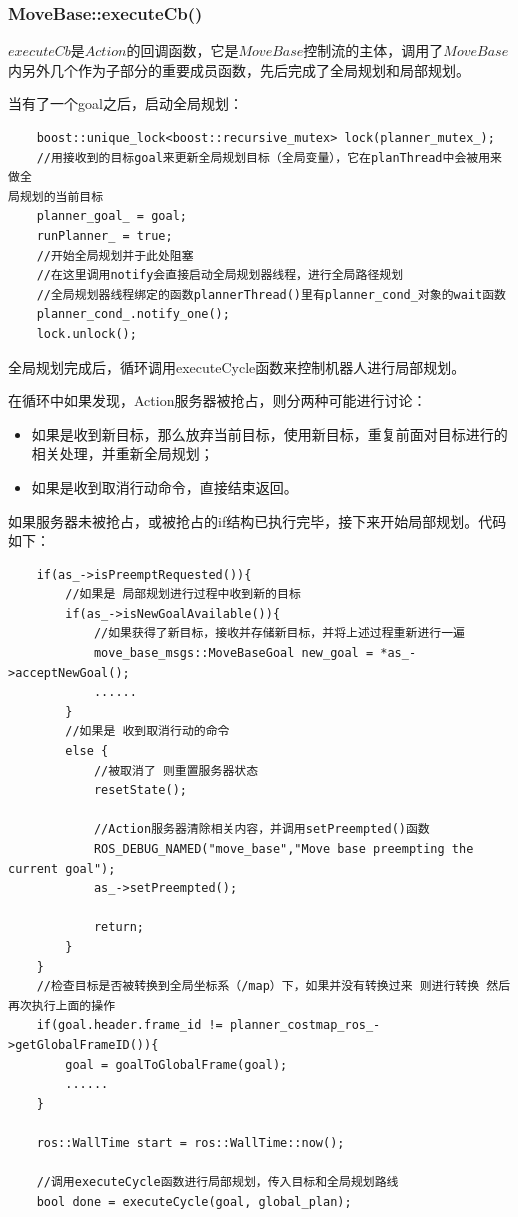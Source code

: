 \documentclass[9pt, oneside]{book}
\begin{document}
\subsubsection{MoveBase::executeCb()}

$executeCb$是$Action$的回调函数，它是$MoveBase$控制流的主体，调用了$MoveBase$内另外几个作为子部分的重要成员函数，先后完成了全局规划和局部规划。

当有了一个goal之后，启动全局规划：

\begin{verbatim}
    boost::unique_lock<boost::recursive_mutex> lock(planner_mutex_);
    //用接收到的目标goal来更新全局规划目标（全局变量），它在planThread中会被用来做全
局规划的当前目标
    planner_goal_ = goal;
    runPlanner_ = true;
    //开始全局规划并于此处阻塞
    //在这里调用notify会直接启动全局规划器线程，进行全局路径规划
    //全局规划器线程绑定的函数plannerThread()里有planner_cond_对象的wait函数
    planner_cond_.notify_one();
    lock.unlock();
\end{verbatim}

全局规划完成后，循环调用executeCycle函数来控制机器人进行局部规划。

在循环中如果发现，Action服务器被抢占，则分两种可能进行讨论：

\begin{itemize}
    \item 如果是收到新目标，那么放弃当前目标，使用新目标，重复前面对目标进行的相关处理，并重新全局规划；
    \item 如果是收到取消行动命令，直接结束返回。
\end{itemize}

如果服务器未被抢占，或被抢占的if结构已执行完毕，接下来开始局部规划。代码如下：

\footnotesize
\begin{verbatim}
    if(as_->isPreemptRequested()){
        //如果是 局部规划进行过程中收到新的目标
        if(as_->isNewGoalAvailable()){
            //如果获得了新目标，接收并存储新目标，并将上述过程重新进行一遍
            move_base_msgs::MoveBaseGoal new_goal = *as_->acceptNewGoal();
            ......
        }
        //如果是 收到取消行动的命令
        else {
            //被取消了 则重置服务器状态
            resetState();

            //Action服务器清除相关内容，并调用setPreempted()函数
            ROS_DEBUG_NAMED("move_base","Move base preempting the current goal");
            as_->setPreempted();

            return;
        }
    }
    //检查目标是否被转换到全局坐标系（/map）下，如果并没有转换过来 则进行转换 然后再次执行上面的操作
    if(goal.header.frame_id != planner_costmap_ros_->getGlobalFrameID()){
        goal = goalToGlobalFrame(goal);
        ......
    }

    ros::WallTime start = ros::WallTime::now();

    //调用executeCycle函数进行局部规划，传入目标和全局规划路线
    bool done = executeCycle(goal, global_plan);
\end{verbatim}
\normalsize
\end{document}
